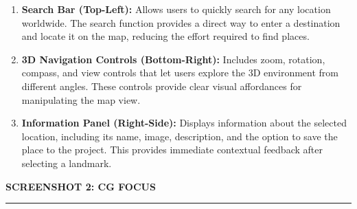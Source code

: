 \documentclass[12pt,a4paper,landscape]{article}
\newcommand{\pagetitle}[1]{

    \begin{center}

        {\color{DarkBlue}
        \fontsize{21}{24}\selectfont
        \bfseries #1}

        \vspace{0.15cm}

        \rule{18.5cm}{0.5pt}

    \end{center}

    \vspace{0.30cm}
}
\begin{document}

\vspace{0.22cm}

\begin{enumerate}[
    label=\textcolor{Red}{\bfseries\arabic*.},
    leftmargin=0.72cm,
    rightmargin=0.25cm,
    itemsep=3pt,
    topsep=0pt,
    parsep=0pt
]

\item
\textbf{Search Bar (Top-Left):}
Allows users to quickly search for any location worldwide.
The search function provides a direct way to enter a destination
and locate it on the map, reducing the effort required to find
places.

\item
\textbf{3D Navigation Controls (Bottom-Right):}
Includes zoom, rotation, compass, and view controls that let
users explore the 3D environment from different angles.
These controls provide clear visual affordances for manipulating
the map view.

\item
\textbf{Information Panel (Right-Side):}
Displays information about the selected location, including
its name, image, description, and the option to save the place
to the project. This provides immediate contextual feedback
after selecting a landmark.

\end{enumerate}



\newpage



\pagetitle{SCREENSHOT 2: CG FOCUS}

\end{document}
